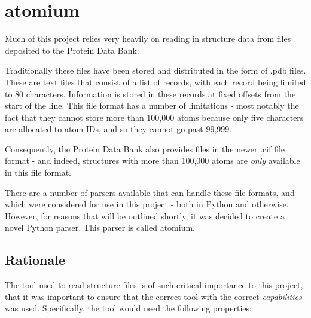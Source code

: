



\chapter{atomium} %


Much of this project relies very heavily on reading in structure data from files deposited to the Protein Data Bank.

Traditionally these files have been stored and distributed in the form of .pdb files. These are text files that consist of a list of records, with each record being limited to 80 characters. Information is stored in these records at fixed offsets from the start of the line. This file format has a number of limitations - most notably the fact that they cannot store more than 100,000 atoms because only five characters are allocated to atom IDs, and so they cannot go past 99,999.

Consequently, the Protein Data Bank also provides files in the newer .cif file format - and indeed, structures with more than 100,000 atoms are \emph{only} available in this file format.

There are a number of parsers available that can handle these file formats, and which were considered for use in this project - both in Python and otherwise. However, for reasons that will be outlined shortly, it was decided to create a novel Python parser. This parser is called atomium.

\section{Rationale}

The tool used to read structure files is of such critical importance to this project, that it was important to ensure that the correct tool with the correct \emph{capabilities} was used. Specifically, the tool would need the following properties:

